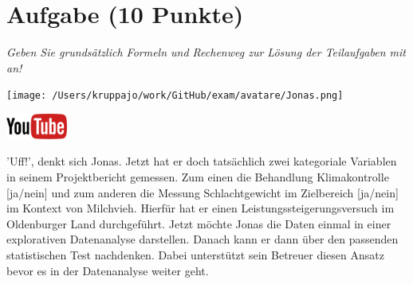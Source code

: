 \documentclass[a4paper, 9pt]{scrartcl}\usepackage[]{graphicx}\usepackage[]{xcolor}
\begin{document}
\section{Aufgabe \hfill (10 Punkte)}

\textit{Geben Sie grundsätzlich Formeln und Rechenweg zur Lösung der Teilaufgaben mit an!} \\[1Ex]
 

 
\begin{minipage}[t]{0.5\textwidth}
\texttt{[image: /Users/kruppajo/work/GitHub/exam/avatare/Jonas.png]}
\end{minipage}
\begin{minipage}[t]{0.5\textwidth}
\hfill
\href{https://youtu.be/t_1KL77mfmg}{\includegraphics[width = 2cm]{img/youtube}}\\[1Ex]
\end{minipage}
\vspace{1ex}



'Uff!', denkt sich Jonas. Jetzt hat er doch tatsächlich zwei kategoriale Variablen in seinem Projektbericht gemessen. Zum einen die Behandlung Klimakontrolle [ja/nein] und zum anderen die Messung Schlachtgewicht im Zielbereich [ja/nein] im Kontext von Milchvieh. Hierfür hat er einen Leistungssteigerungsversuch im Oldenburger Land durchgeführt. Jetzt möchte Jonas die Daten einmal in einer explorativen Datenanalyse darstellen. Danach kann er dann über den passenden statistischen Test nachdenken. Dabei unterstützt sein Betreuer diesen Ansatz bevor es in der Datenanalyse weiter geht.



\vspace{1Ex}
\end{document}

